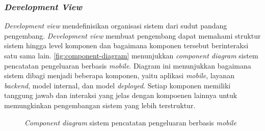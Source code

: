\subsubsection{\emph{Development View}}
\label{subsubsec:development-view}
\emph{Development view} mendefinisikan organisasi sistem dari sudut pandang pengembang. \emph{Development view} membuat pengembang dapat memahami struktur sistem hingga level komponen dan bagaimana komponen tersebut berinteraksi satu sama lain. \autoref{fig:component-diagram} menunjukkan \emph{component diagram} sistem pencatatan pengeluaran berbasis \emph{mobile}. Diagram ini menunjukkan bagaimana sistem dibagi menjadi beberapa komponen, yaitu aplikasi \emph{mobile}, layanan \emph{backend}, model internal, dan model \emph{deployed}. Setiap komponen memiliki tanggung jawab dan interaksi yang jelas dengan kompoenen lainnya untuk memungkinkan pengembangan sistem yang lebih terstruktur.

\begin{figure}[htbp]
    \centering
    \caption{\emph{Component diagram} sistem pencatatan pengeluaran berbasis \emph{mobile}}
    \label{fig:component-diagram}
\end{figure}